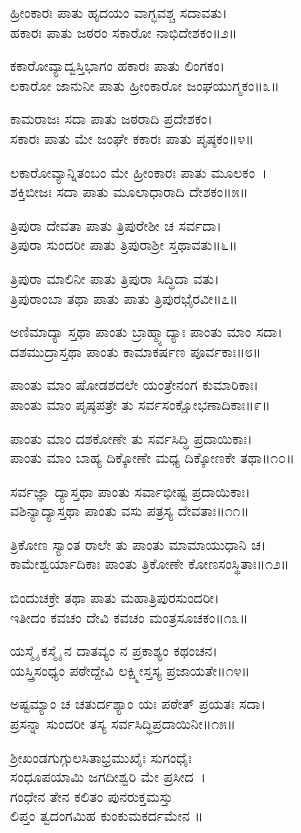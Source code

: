 ಹ್ರೀಂಕಾರಃ ಪಾತು ಹೃದಯಂ ವಾಗ್ಭವಶ್ಚ ಸದಾವತು।\\
ಹಕಾರಃ ಪಾತು ಜಠರಂ ಸಕಾರೋ ನಾಭಿದೇಶಕಂ॥೨॥

ಕಕಾರೋವ್ಯಾದ್ವಸ್ತಿಭಾಗಂ ಹಕಾರಃ ಪಾತು ಲಿಂಗಕಂ।\\
ಲಕಾರೋ ಜಾನುನೀ ಪಾತು ಹ್ರೀಂಕಾರೋ ಜಂಘಯುಗ್ಮಕಂ॥೩॥

ಕಾಮರಾಜಃ ಸದಾ ಪಾತು ಜಠರಾದಿ ಪ್ರದೇಶಕಂ।\\
ಸಕಾರಃ ಪಾತು ಮೇ ಜಂಘೇ ಕಕಾರಃ ಪಾತು ಪೃಷ್ಠಕಂ॥೪॥

ಲಕಾರೋವ್ಯಾನ್ನಿತಂಬಂ ಮೇ ಹ್ರೀಂಕಾರಃ ಪಾತು ಮೂಲಕಂ~।\\
ಶಕ್ತಿಬೀಜಃ ಸದಾ ಪಾತು ಮೂಲಾಧಾರಾದಿ ದೇಶಕಂ॥೫॥

ತ್ರಿಪುರಾ ದೇವತಾ ಪಾತು ತ್ರಿಪುರೇಶೀ ಚ ಸರ್ವದಾ।\\
ತ್ರಿಪುರಾ ಸುಂದರೀ ಪಾತು ತ್ರಿಪುರಾಶ್ರೀ ಸ್ತಥಾವತು॥೬॥

ತ್ರಿಪುರಾ ಮಾಲಿನೀ ಪಾತು ತ್ರಿಪುರಾ ಸಿದ್ಧಿದಾ ವತು।\\
ತ್ರಿಪುರಾಂಬಾ ತಥಾ ಪಾತು ಪಾತು ತ್ರಿಪುರಭೈರವೀ॥೭॥

ಅಣಿಮಾದ್ಯಾ ಸ್ತಥಾ ಪಾಂತು ಬ್ರಾಹ್ಮ್ಯಾದ್ಯಾಃ ಪಾಂತು ಮಾಂ ಸದಾ।\\
ದಶಮುದ್ರಾಸ್ತಥಾ ಪಾಂತು ಕಾಮಾಕರ್ಷಣ ಪೂರ್ವಕಾಃ॥೮॥

ಪಾಂತು ಮಾಂ ಷೋಡಶದಲೇ ಯಂತ್ರೇನಂಗ ಕುಮಾರಿಕಾಃ।\\
ಪಾಂತು ಮಾಂ ಪೃಷ್ಠಪತ್ರೇ ತು ಸರ್ವಸಂಕ್ಷೋಭಣಾದಿಕಾಃ॥೯॥

ಪಾಂತು ಮಾಂ ದಶಕೋಣೇ ತು ಸರ್ವಸಿದ್ಧಿ ಪ್ರದಾಯಿಕಾಃ।\\
ಪಾಂತು ಮಾಂ ಬಾಹ್ಯ ದಿಕ್ಕೋಣೇ ಮಧ್ಯ ದಿಕ್ಕೋಣಕೇ ತಥಾ॥೧೦॥

ಸರ್ವಜ್ಞಾ ದ್ಯಾಸ್ತಥಾ ಪಾಂತು ಸರ್ವಾಭೀಷ್ಟ ಪ್ರದಾಯಿಕಾಃ।\\
ವಶಿನ್ಯಾದ್ಯಾಸ್ತಥಾ ಪಾಂತು ವಸು ಪತ್ರಸ್ಯ ದೇವತಾಃ॥೧೧॥

ತ್ರಿಕೋಣ ಸ್ಯಾಂತ ರಾಲೇ ತು ಪಾಂತು ಮಾಮಾಯುಧಾನಿ ಚ।\\
ಕಾಮೇಶ್ವರ್ಯಾದಿಕಾಃ ಪಾಂತು ತ್ರಿಕೋಣೇ ಕೋಣಸಂಸ್ಥಿತಾಃ॥೧೨॥

ಬಿಂದುಚಕ್ರೇ ತಥಾ ಪಾತು ಮಹಾತ್ರಿಪುರಸುಂದರೀ।\\
ಇತೀದಂ ಕವಚಂ ದೇವಿ ಕವಚಂ ಮಂತ್ರಸೂಚಕಂ॥೧೩॥

ಯಸ್ಮೈ ಕಸ್ಮೈ ನ ದಾತವ್ಯಂ ನ ಪ್ರಕಾಶ್ಯಂ ಕಥಂಚನ।\\
ಯಸ್ತ್ರಿಸಂಧ್ಯಂ ಪಠೇದ್ದೇವಿ ಲಕ್ಷ್ಮೀಸ್ತಸ್ಯ ಪ್ರಜಾಯತೇ॥೧೪॥

ಅಷ್ಟಮ್ಯಾಂ ಚ ಚತುರ್ದಶ್ಯಾಂ ಯಃ ಪಠೇತ್ ಪ್ರಯತಃ ಸದಾ।\\
ಪ್ರಸನ್ನಾ ಸುಂದರೀ ತಸ್ಯ ಸರ್ವಸಿದ್ಧಿಪ್ರದಾಯಿನೀ॥೧೫॥

ಶ್ರೀಖಂಡಗುಗ್ಗುಲಸಿತಾಭ್ರಮುಖೈಃ ಸುಗಂಧೈಃ \\ಸಂಧೂಪಯಾಮಿ ಜಗದೀಶ್ವರಿ ಮೇ ಪ್ರಸೀದ~।\\
ಗಂಧೇನ ತೇನ ಕಲಿತಂ ಪುನರುಕ್ತಮಸ್ತು\\ ಲಿಪ್ತಂ ತ್ವದಂಗಮಿಹ ಕುಂಕುಮಕರ್ದಮೇನ ॥

